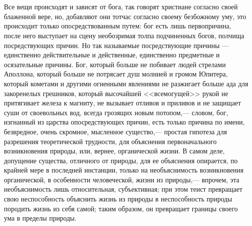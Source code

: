 \documentclass[12pt]{article}
\begin{document}
\section{}

Все вещи происходят и зависят от бога, так говорят христиане согласно своей блаженной вере, но, добавляют они тотчас согласно своему безбожному уму, это происходит только опосредствованным путем: бог есть лишь первопричина, после него выступает на сцену необозримая толпа подчиненных богов, полчища посредствующих причин. Но так называемые посредствующие причины --- единственно действительные и действенные, единственно предметные и осязательные причины. Бог, который больше не побивает людей стрелами Аполлона, который больше не потрясает душ молнией и громом Юпитера, который кометами и другими огненными явлениями не разжигает больше ада для закоренелых грешников, который высочайшей <<всемогущей>> рукой не притягивает железа к магниту, не вызывает отливов и приливов и не защищает суши от своевольных вод, всегда грозящих новым потопом,--- словом, бог, изгнанный из царства опосредствующих причин, есть только причина по имени, безвредное, очень скромное, мысленное существо,--- простая гипотеза для разрешения теоретической трудности, для объяснения первоначального возникновения природы, или, вернее, органической жизни. В самом деле, допущение существа, отличного от природы, для ее объяснения опирается, по крайней мере в последней инстанции, только на необъяснимость возникновения органической, в особенности человеческой, жизни из природы,--- впрочем, эта необъяснимость лишь относительная, субъективная; при этом теист превращает свою неспособность объяснить жизнь из природы в неспособность природы породить жизнь из себя самой; таким образом, он превращает границы своего ума в пределы природы.



\section{}
\end{document}
